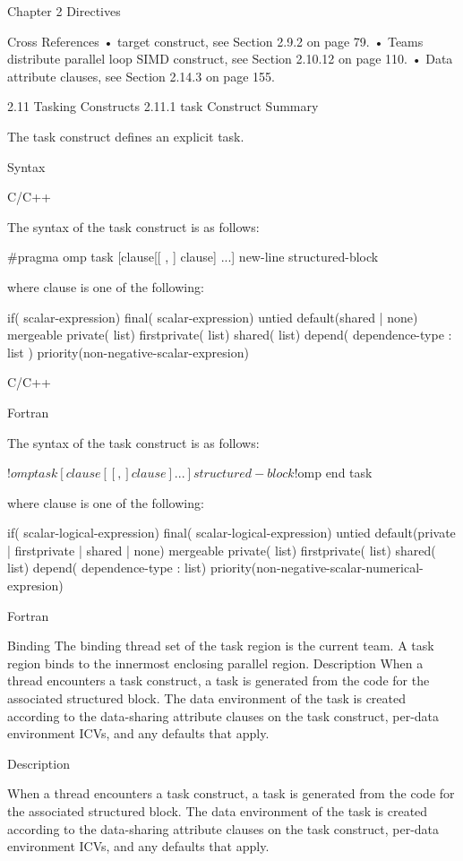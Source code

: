 Chapter 2 Directives

Cross References
• target construct, see Section 2.9.2 on page 79.
• Teams distribute parallel loop SIMD construct, see Section 2.10.12 on page 110.
• Data attribute clauses, see Section 2.14.3 on page 155.

2.11 Tasking Constructs
2.11.1 task Construct Summary

The task construct defines an explicit task.

Syntax

C/C++

The syntax of the task construct is as follows:


#pragma omp task [clause[[ , ] clause] ...] new-line
structured-block

where clause is one of the following:

if( scalar-expression)
final( scalar-expression)
untied
default(shared | none)
mergeable
private( list)
firstprivate( list)
shared( list)
depend( dependence-type : list )
priority(non-negative-scalar-expresion)

C/C++

Fortran

The syntax of the task construct is as follows:

!$omp task [clause[[ , ] clause] ...]
structured-block
!$omp end task

where clause is one of the following:

if( scalar-logical-expression)
final( scalar-logical-expression)
untied
default(private | firstprivate | shared | none)
mergeable
private( list)
firstprivate( list)
shared( list)
depend( dependence-type : list)
priority(non-negative-scalar-numerical-expresion)

Fortran

Binding The binding thread set of the task region is the current team. A task region binds to the innermost enclosing parallel region.  Description When a thread encounters a task construct, a task is generated from the code for the associated structured block. The data environment of the task is created according to the data-sharing attribute clauses on the task construct, per-data environment ICVs, and any defaults that apply.

Description

When a thread encounters a task construct, a task is generated from the code for the associated structured block. The data environment of the task is created according to the data-sharing attribute clauses on the task construct, per-data environment ICVs, and any defaults that apply.

